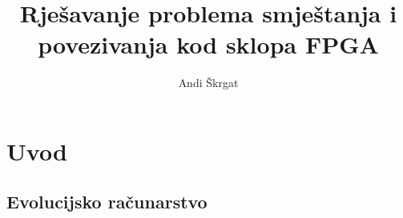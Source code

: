 \documentclass[times, utf8, zavrsni]{fer}
\begin{document}
	
	
	\title{Rješavanje problema smještanja i povezivanja kod sklopa FPGA}
	
	\author{Andi Škrgat}
	
	\maketitle
	
	\izvornik
	
	\zahvala{}
	
	\tableofcontents
	
	\chapter{Uvod}
	
	\section{Evolucijsko računarstvo}
	
\end{document}
